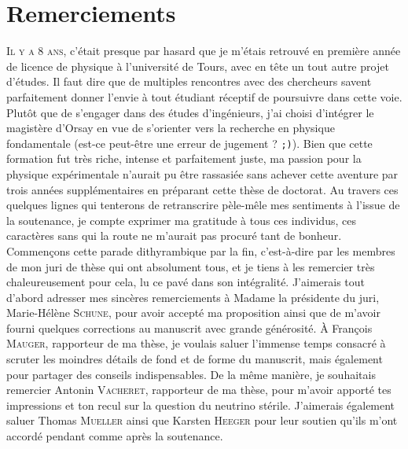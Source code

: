 

\chapter*{Remerciements}
\label{chap:remerciements}

\lettrine{I}{l y a 8 ans}, c'était presque par hasard que je m'étais retrouvé en première année de licence de physique à l'université de Tours, avec en tête un tout autre projet d'études. Il faut dire que de multiples rencontres avec des chercheurs savent parfaitement donner l'envie à tout étudiant réceptif de poursuivre dans cette voie. Plutôt que de s'engager dans des études d'ingénieurs, j'ai choisi d'intégrer le magistère d'Orsay en vue de s'orienter vers la recherche en physique fondamentale (est-ce peut-être une erreur de jugement ? {\tt ;)}). Bien que cette formation fut très riche, intense et parfaitement juste, ma passion pour la physique expérimentale n'aurait pu être rassasiée sans achever cette aventure par trois années supplémentaires en préparant cette thèse de doctorat. Au travers ces quelques lignes qui tenterons de retranscrire pèle-mêle mes sentiments à l'issue de la soutenance, je compte exprimer ma gratitude à tous ces individus, ces caractères sans qui la route ne m'aurait pas procuré tant de bonheur.\\

Commençons cette parade dithyrambique par la fin, c'est-à-dire par les membres de mon juri de thèse qui ont absolument tous, et je tiens à les remercier très chaleureusement pour cela, lu ce pavé dans son intégralité. J'aimerais tout d'abord adresser mes sincères remerciements à Madame la présidente du juri, Marie-Hélène \textsc{Schune}, pour avoir accepté ma proposition ainsi que de m'avoir fourni quelques corrections au manuscrit avec grande générosité. À François \textsc{Mauger}, rapporteur de ma thèse, je voulais saluer l'immense temps consacré à scruter les moindres détails de fond et de forme du manuscrit, mais également pour partager des conseils indispensables. De la même manière, je souhaitais remercier Antonin \textsc{Vacheret}, rapporteur de ma thèse, pour m'avoir apporté tes impressions et ton recul sur la question du neutrino stérile. J'aimerais également saluer Thomas \textsc{Mueller} ainsi que Karsten \textsc{Heeger} pour leur soutien qu'ils m'ont accordé pendant comme après la soutenance.\\

